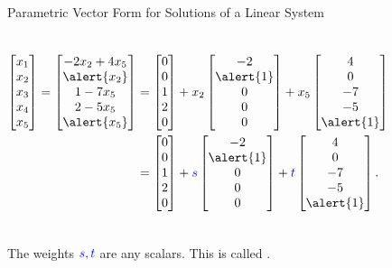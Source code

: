 \documentclass[xcolor=dvipsnames,aspectratio=169,t]{beamer}
\begin{document}
\begin{frame}{Parametric Vector Form for Solutions of a Linear System}
{\begin{columns}
  \pause
  \vspace*{-.5em}%
  \begin{align*}
    \begin{bmatrix} x_1 \\ x_2 \\ x_3 \\ x_4 \\ x_5 \end{bmatrix} 
    = \begin{bmatrix} -2x_2 +4x_5\\ \alert{x_2} \\ 1-7x_5 \\ 2-5x_5 \\ \alert{x_5} \end{bmatrix}
    &= \begin{bmatrix} 0 \\ 0 \\ 1 \\ 2 \\ 0 \end{bmatrix}
    + x_2 \begin{bmatrix} -2 \\ \alert{1} \\ 0 \\ 0 \\ 0 \end{bmatrix}
    + x_5 \begin{bmatrix} 4 \\ 0 \\ -7 \\ -5 \\ \alert{1} \end{bmatrix}\\
    &= \begin{bmatrix} 0 \\ 0 \\ 1 \\ 2 \\ 0 \end{bmatrix}
    + \colorb{s} \begin{bmatrix} -2 \\ \alert{1} \\ 0 \\ 0 \\ 0 \end{bmatrix}
    + \colorb{t} \begin{bmatrix} 4 \\ 0 \\ -7 \\ -5 \\ \alert{1} \end{bmatrix}.
  \end{align*}
  \end{columns}
  }
  \bigskip
  
  \hspace*{10em} The weights $\textcolor{blue}{s,t}$ are any scalars. This is called .
\end{frame}
\end{document}
